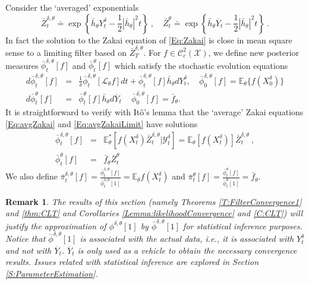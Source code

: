 \documentclass{article}
\newtheorem{remark}{ Remark}
\begin{document}
Consider the `averaged' exponentials
\begin{equation}
\bar{Z}_t^{\delta,\theta}\doteq \exp\left\{ \bar{h}_{\theta} Y_t^\delta-\frac{1}{2}\left|\bar{h}_{\theta}\right|^{2}t   \right\}\ ,\quad \bar{Z}_t^{\theta}\doteq \exp\left\{ \bar{h}_{\theta}\overline{Y}_t-\frac{1}{2}\left|\bar{h}_{\theta}\right|^{2}t   \right\}\ .\label{Eq:DefinitionsZ}
\end{equation}
In fact the solution to the Zakai equation of \eqref{Eq:Zakai} is close in mean square sense  to a limiting filter based on $\bar Z_T^{\delta,\theta}$. For $f\in\mathcal{C}^{2}_{c}(\mathcal{X})$, we define new posterior measures $\bar{\phi}^{\delta,\theta}_{t}[f]$ and $\bar{\phi}^{\theta}_{t}[f]$ which satisfy the stochastic evolution equations
\begin{eqnarray}
\label{Eq:avgZakai}
d\bar{\phi}^{\delta,\theta}_{t}[f]&=&\frac{1}{\delta}\bar{\phi}^{\delta,\theta}_{t}[\mathcal{L}_{\theta}f]dt+\bar{\phi}^{\delta,\theta}_t[f] \bar{h}_{\theta} dY^{\delta}_t, \quad \bar{\phi}^{\delta,\theta}_{0}[f]=\mathbb{E}_{\theta}\{f(X_{0}^{\delta})\}\\
\label{Eq:avgZakaiLimit}
d\bar{\phi}^{\theta}_{t}[f]&=& \bar{\phi}^{\theta}_t[f] \bar{h}_{\theta} d\overline Y_t\, \quad  \bar{\phi}^{\delta,\theta}_{0}[f]=\bar{f}_{\theta}.
 \end{eqnarray}
It is straightforward to verify with It\^o's lemma that the `average' Zakai equations  \eqref{Eq:avgZakai} and \eqref{Eq:avgZakaiLimit} have solutions
\begin{eqnarray}
\label{Eq:solAvgZakai}
\bar{\phi}^{\delta,\theta}_{t}[f]&=&\mathbb E_{\theta}^*\left[ f(X_{t}^{\delta}) \bar{Z}_t^{\delta,\theta}\Big|\mathcal Y_t^\delta\right] = \mathbb E_{\theta}[ f(X_{t}^{\delta}) ]\bar{Z}_t^{\delta,\theta}\ ,\\
\label{Eq:solAvgZakaiLimit}
\bar{\phi}^{\theta}_{t}[f]&=& \bar{f}_{\theta} \bar{Z}_t^{\theta}\
\end{eqnarray}
We also define $\bar{\pi}^{\delta,\theta}_{t}[f]=\frac{\bar{\phi}^{\delta,\theta}_{t}[f]}{\bar{\phi}^{\delta,\theta}_{t}[1]}=\mathbb E_{\theta} f(X_{t}^{\delta}) $ and $\bar{\pi}^{\theta}_{t}[f]=\frac{\bar{\phi}^{\theta}_{t}[f]}{\bar{\phi}^{\theta}_{t}[1]}=\bar{f}_{\theta}$.

\begin{remark}
The results of this section (namely Theorems \ref{T:FilterConvergence1} and \ref{thm:CLT} and Corollaries \ref{Lemma:likelihoodConvergence} and \ref{C:CLT}) will justify the approximation of $\phi^{\delta,\theta}[1]$ by $\bar{\phi}^{\delta,\theta}[1]$ for statistical inference purposes. Notice that $\bar{\phi}^{\delta,\theta}[1]$ is associated with the actual data, i.e., it is associated with $Y_t^\delta$ and not with $\overline{Y}_t$. $\overline{Y}_t$ is only used as a vehicle to obtain the necessary convergence results. Issues related with statistical inference are explored in Section \ref{S:ParameterEstimation}.
\end{remark}
\end{document}
